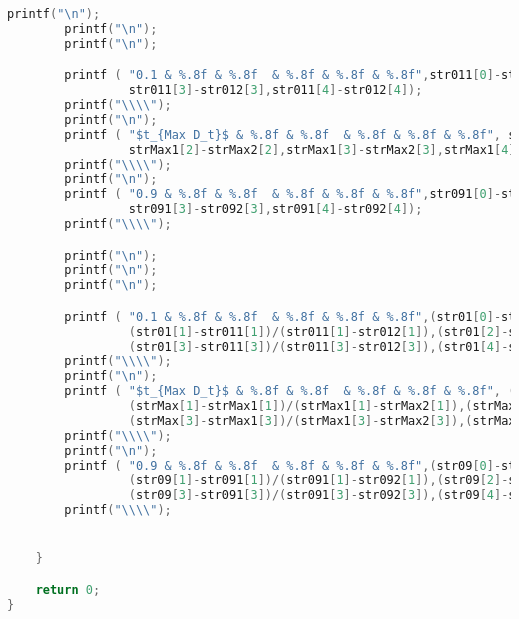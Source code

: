 \documentclass{article}
\theoremstyle{remark}
\theoremstyle{definition}
\begin{document}
\begin{lstlisting}[language=C]
        printf("\n");
        printf("\n");
        printf("\n");

        printf ( "0.1 & %.8f & %.8f  & %.8f & %.8f & %.8f",str011[0]-str012[0],str011[1]-str012[1],str011[2]-str012[2],
                 str011[3]-str012[3],str011[4]-str012[4]);
        printf("\\\\");
        printf("\n");
        printf ( "$t_{Max D_t}$ & %.8f & %.8f  & %.8f & %.8f & %.8f", strMax1[0]-strMax2[0],strMax1[1]-strMax2[1],
                 strMax1[2]-strMax2[2],strMax1[3]-strMax2[3],strMax1[4]-strMax2[4]) ;
        printf("\\\\");
        printf("\n");
        printf ( "0.9 & %.8f & %.8f  & %.8f & %.8f & %.8f",str091[0]-str092[0],str091[1]-str092[1],str091[2]-str092[2],
                 str091[3]-str092[3],str091[4]-str092[4]);
        printf("\\\\");

        printf("\n");
        printf("\n");
        printf("\n");

        printf ( "0.1 & %.8f & %.8f  & %.8f & %.8f & %.8f",(str01[0]-str011[0])/(str011[0]-str012[0]),
                 (str01[1]-str011[1])/(str011[1]-str012[1]),(str01[2]-str011[2])/(str011[2]-str012[2]),
                 (str01[3]-str011[3])/(str011[3]-str012[3]),(str01[4]-str011[4])/(str011[4]-str012[4]));
        printf("\\\\");
        printf("\n");
        printf ( "$t_{Max D_t}$ & %.8f & %.8f  & %.8f & %.8f & %.8f", (strMax[0]-strMax1[0])/( strMax1[0]-strMax2[0]),
                 (strMax[1]-strMax1[1])/(strMax1[1]-strMax2[1]),(strMax[2]-strMax1[2])/(strMax1[2]-strMax2[2]),
                 (strMax[3]-strMax1[3])/(strMax1[3]-strMax2[3]),(strMax[4]-strMax1[4])/(strMax1[4]-strMax2[4]));
        printf("\\\\");
        printf("\n");
        printf ( "0.9 & %.8f & %.8f  & %.8f & %.8f & %.8f",(str09[0]-str091[0])/(str091[0]-str092[0]),
                 (str09[1]-str091[1])/(str091[1]-str092[1]),(str09[2]-str091[2])/(str091[2]-str092[2]),
                 (str09[3]-str091[3])/(str091[3]-str092[3]),(str09[4]-str091[4])/(str091[4]-str092[4]));
        printf("\\\\");


    }

    return 0;
}




\end{lstlisting}
\end{document}
